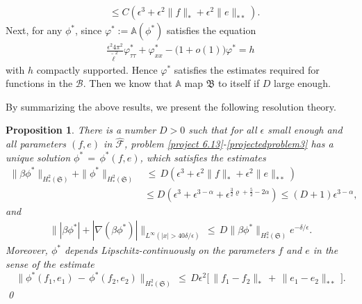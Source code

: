 \documentclass[10pt, reqno]{amsart}
\numberwithin{equation}{section}
\newtheorem{proposition}[theorem]{Proposition}
\theoremstyle{definition}
\begin{document}
{\begin{align}
\nonumber
 \\[2mm]
 & \leq C \left( \epsilon^3+ \epsilon^2\|f\|_* + \epsilon^2\|e\|_{**}\right).
\end{align}
Next, for any $\phi^*$, since $\varphi^* :=\mathbb A (\phi^*) $ satisfies the equation
\begin{align*}
\frac{\epsilon^2 4\pi^2}{{\tilde\ell}^2} \varphi^*_{\tau\tau} + \varphi^*_{xx} - \big(1+ o(1)\big)\varphi^* = h
\end{align*}
with $h$ compactly supported. Hence $ \varphi^* $ satisfies the estimates required for functions in the $\mathcal B$.
Then we know that $\mathbb{A}$ map $\mathfrak B$ to itself if $D$ large enough.






\medskip
By summarizing the above results, we present the following resolution theory.
\begin{proposition}\label{proposition6.5}
There is a number $D>0$ such that for all $\epsilon$ small enough and all parameters $(f, e)$ in $\hat{\mathcal F}$,
problem \eqref{project 6.13}-\eqref{projectedproblem3} has a unique solution $\phi^* \,=\, \phi^*(f, e)$, which satisfies the estimates
\begin{align*}
 \|\beta \phi^*\|_{H_*^2(\mathfrak S)} + \| \phi^*\|_{H_*^2(\mathfrak S)} & \,\leq\, D \left( \epsilon^3+ \epsilon^2\|f\|_* + \epsilon^2\|e\|_{**}\right)
\nonumber
 \\[2mm]
 &\le D \left( \epsilon^3+ \epsilon^{3-\alpha} + \epsilon^{\frac 32 \varrho + \frac 52- 2\alpha} \right) \le ( D+1) \epsilon^{3-\alpha},
\end{align*}
and
\begin{align*}
\big\| |\beta\phi^*|+|\nabla \left(\beta \phi^*\right)| \big\|_{L^{\infty}(|x|>40\delta/\epsilon)}\,\leq\, D \|\beta\phi^*\|_{H_*^2(\mathfrak S)}e^{-\delta/\epsilon}.
\end{align*}
 Moreover, $\phi^*$ depends Lipschitz-continuously on the parameters $f$ and $e$ in the sense of the estimate
\begin{equation}
\label{characteriztion}
\|\phi^*(f_1, e_1)\,-\, \phi^*(f_2, e_2)\|_{H_*^2(\mathfrak S)}
\,\leq\, D\epsilon^2\big [\, \|f_1-f_2\|_{*}\,+\, \|e_1-e_2\|_{**}\, \big].
\end{equation}
\qed
\end{proposition}













}
\end{document}
